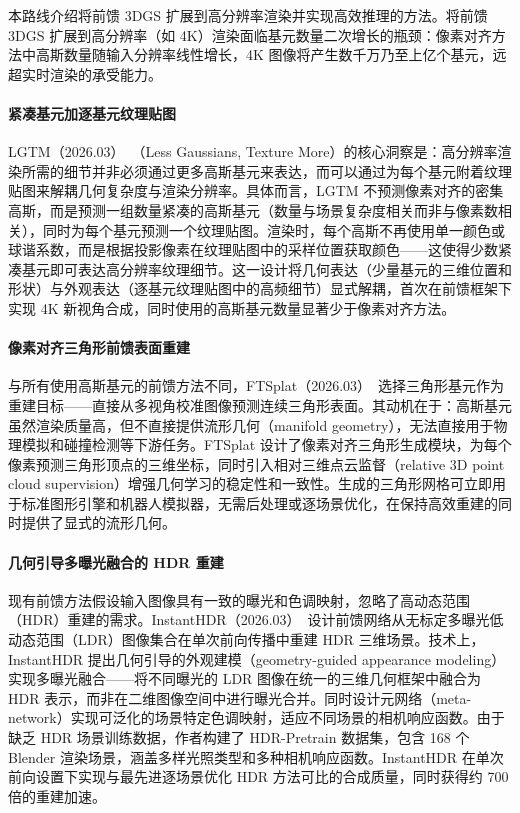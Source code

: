 本路线介绍将前馈 3DGS 扩展到高分辨率渲染并实现高效推理的方法。将前馈 3DGS 扩展到高分辨率（如 4K）渲染面临基元数量二次增长的瓶颈：像素对齐方法中高斯数量随输入分辨率线性增长，4K 图像将产生数千万乃至上亿个基元，远超实时渲染的承受能力。

\paragraph{紧凑基元加逐基元纹理贴图}

LGTM（2026.03）~\cite{2603_25745}（Less Gaussians, Texture More）的核心洞察是：高分辨率渲染所需的细节并非必须通过更多高斯基元来表达，而可以通过为每个基元附着纹理贴图来解耦几何复杂度与渲染分辨率。具体而言，LGTM 不预测像素对齐的密集高斯，而是预测一组数量紧凑的高斯基元（数量与场景复杂度相关而非与像素数相关），同时为每个基元预测一个纹理贴图。渲染时，每个高斯不再使用单一颜色或球谐系数，而是根据投影像素在纹理贴图中的采样位置获取颜色——这使得少数紧凑基元即可表达高分辨率纹理细节。这一设计将几何表达（少量基元的三维位置和形状）与外观表达（逐基元纹理贴图中的高频细节）显式解耦，首次在前馈框架下实现 4K 新视角合成，同时使用的高斯基元数量显著少于像素对齐方法。

\paragraph{像素对齐三角形前馈表面重建}

与所有使用高斯基元的前馈方法不同，FTSplat（2026.03）~\cite{2603_05932}选择三角形基元作为重建目标——直接从多视角校准图像预测连续三角形表面。其动机在于：高斯基元虽然渲染质量高，但不直接提供流形几何（manifold geometry），无法直接用于物理模拟和碰撞检测等下游任务。FTSplat 设计了像素对齐三角形生成模块，为每个像素预测三角形顶点的三维坐标，同时引入相对三维点云监督（relative 3D point cloud supervision）增强几何学习的稳定性和一致性。生成的三角形网格可立即用于标准图形引擎和机器人模拟器，无需后处理或逐场景优化，在保持高效重建的同时提供了显式的流形几何。

\paragraph{几何引导多曝光融合的 HDR 重建}

现有前馈方法假设输入图像具有一致的曝光和色调映射，忽略了高动态范围（HDR）重建的需求。InstantHDR（2026.03）~\cite{2603_11298}设计前馈网络从无标定多曝光低动态范围（LDR）图像集合在单次前向传播中重建 HDR 三维场景。技术上，InstantHDR 提出几何引导的外观建模（geometry-guided appearance modeling）实现多曝光融合——将不同曝光的 LDR 图像在统一的三维几何框架中融合为 HDR 表示，而非在二维图像空间中进行曝光合并。同时设计元网络（meta-network）实现可泛化的场景特定色调映射，适应不同场景的相机响应函数。由于缺乏 HDR 场景训练数据，作者构建了 HDR-Pretrain 数据集，包含 168 个 Blender 渲染场景，涵盖多样光照类型和多种相机响应函数。InstantHDR 在单次前向设置下实现与最先进逐场景优化 HDR 方法可比的合成质量，同时获得约 700 倍的重建加速。


